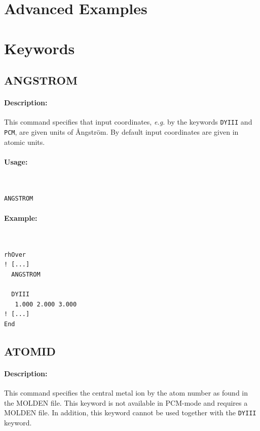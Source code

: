 \documentclass[11pt]{article}
\begin{document}
\clearpage
\section{Advanced Examples}

\clearpage
\section{Keywords}

\subsection{ANGSTROM}

\paragraph{Description:} This command specifies that input coordinates, \emph{e.g.} by the keywords \texttt{DYIII} and \texttt{PCM}, are given units of \AA ngstr\"{o}m. By default input coordinates are given in atomic units. 

\paragraph{Usage:}~ 

\begin{lstlisting}[frame=single]
  ANGSTROM
\end{lstlisting}

\paragraph{Example:}~ 

\begin{lstlisting}[frame=single]
rhOver
! [...]
  ANGSTROM
  
  DYIII
   1.000 2.000 3.000
! [...]
End
\end{lstlisting}

\clearpage
\subsection{ATOMID}

\paragraph{Description:} This command specifies the central metal ion by the atom number as found in the MOLDEN file. This keyword is not available in PCM-mode and requires a MOLDEN file. In addition, this keyword cannot be used together with the \texttt{DYIII} keyword.
\end{document}
